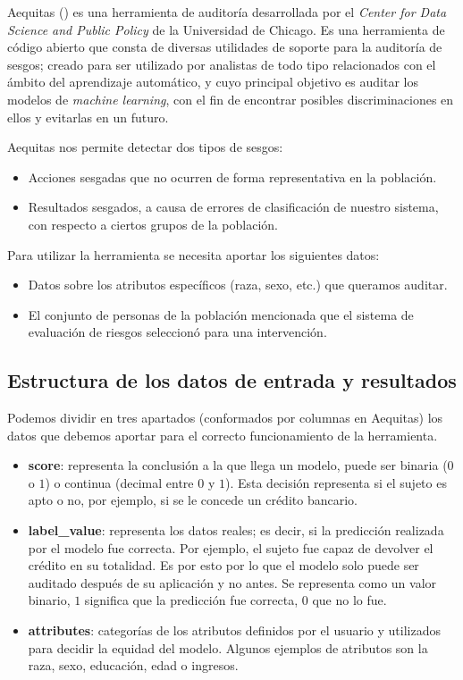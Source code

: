 Aequitas (\cite{aequitas2019}) es una herramienta de auditoría desarrollada por el \textit{Center for Data Science and Public Policy} de la
Universidad de Chicago. Es una herramienta de código abierto que consta de diversas utilidades de soporte para la auditoría de sesgos; creado para ser utilizado por analistas de todo tipo relacionados con el ámbito del aprendizaje automático, y cuyo principal objetivo es auditar los modelos de \textit{machine learning}, con el fin de encontrar posibles discriminaciones en ellos y evitarlas en un futuro.

Aequitas nos permite detectar dos tipos de sesgos:

\begin{itemize}
    \item Acciones sesgadas que no ocurren de forma representativa en la población.
    \item Resultados sesgados, a causa de errores de clasificación de nuestro sistema, con respecto a ciertos grupos de la población.
\end{itemize}

Para utilizar la herramienta se necesita aportar los siguientes datos:

\begin{itemize}
    \item Datos sobre los atributos específicos (raza, sexo, etc.) que queramos auditar.
    \item El conjunto de personas de la población mencionada que el sistema de evaluación de riesgos seleccionó para una intervención.
\end{itemize}

\subsection*{Estructura de los datos de entrada y resultados}

Podemos dividir en tres apartados (conformados por columnas en Aequitas) los datos que debemos aportar para el correcto funcionamiento de la herramienta.

\begin{itemize}
    \item \textbf{score}: representa la conclusión a la que llega un modelo, puede ser binaria ($0$ o $1$) o continua (decimal entre $0$ y $1$). Esta decisión representa si el sujeto es apto o no, por ejemplo, si se le concede un crédito bancario.
    \item \textbf{label\_value}: representa los datos reales; es decir, si la predicción realizada por el modelo fue correcta. Por ejemplo, el sujeto fue capaz de devolver el crédito en su totalidad. Es por esto por lo que el modelo solo puede ser auditado después de su aplicación y no antes. Se representa como un valor binario, $1$ significa que la predicción fue correcta, $0$ que no lo fue.
    \item \textbf{attributes}: categorías de los atributos definidos por el usuario y utilizados para decidir la equidad del modelo. Algunos ejemplos de atributos son la raza, sexo, educación, edad o ingresos.
\end{itemize}

